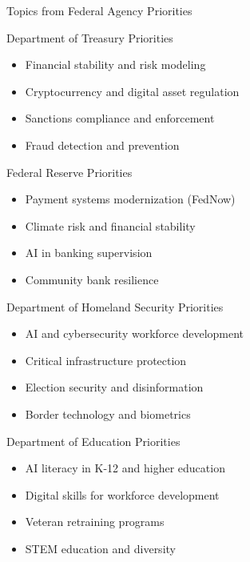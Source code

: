 \documentclass[11pt]{beamer}
\begin{document}
	\begin{frame}{Topics from Federal Agency Priorities}
		\scriptsize
		\begin{block}{Department of Treasury Priorities}
			\begin{itemize}
				\item Financial stability and risk modeling
				\item Cryptocurrency and digital asset regulation
				\item Sanctions compliance and enforcement
				\item Fraud detection and prevention
			\end{itemize}
		\end{block}
		\begin{block}{Federal Reserve Priorities}
			\begin{itemize}
				\item Payment systems modernization (FedNow)
				\item Climate risk and financial stability
				\item AI in banking supervision
				\item Community bank resilience
			\end{itemize}
		\end{block}
		\begin{block}{Department of Homeland Security Priorities}
			\begin{itemize}
				\item AI and cybersecurity workforce development
				\item Critical infrastructure protection
				\item Election security and disinformation
				\item Border technology and biometrics
			\end{itemize}
		\end{block}
		\begin{block}{Department of Education Priorities}
			\begin{itemize}
				\item AI literacy in K-12 and higher education
				\item Digital skills for workforce development
				\item Veteran retraining programs
				\item STEM education and diversity
			\end{itemize}
		\end{block}
	\end{frame}
	
\end{document}
